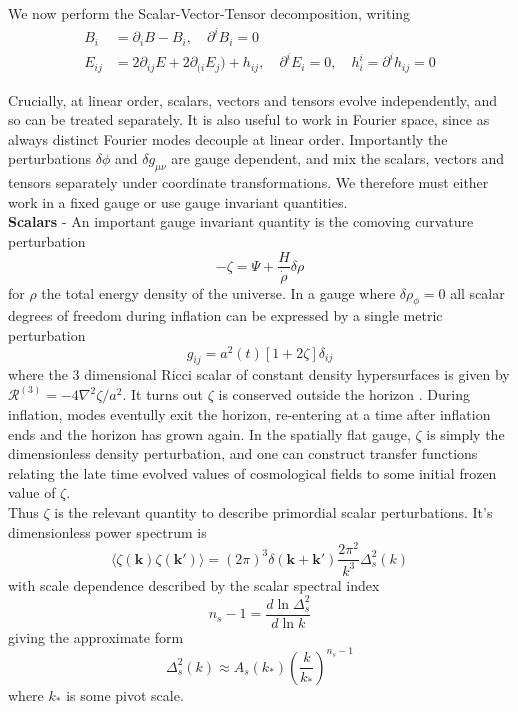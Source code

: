 \documentclass[a4paper,10pt]{article}
\renewcommand{\v}[1]{\mathbf{#1}}
\begin{document}
We now perform the Scalar-Vector-Tensor decomposition, writing
\begin{align}
B_i &= \partial_i B - B_i, \quad \partial^iB_i=0\\
E_{ij} &= 2\partial_{ij}E + 2\partial_{(i}E_{j}) + h_{ij}, \quad \partial^iE_i=0, \quad h^i_i = \partial^ih_{ij}=0
\end{align}

Crucially, at linear order, scalars, vectors and tensors evolve independently, and so can be treated separately. It is also useful to work in Fourier space, since as always distinct Fourier modes decouple at linear order. Importantly the perturbations $\delta\phi$ and $\delta g_{\mu\nu}$ are gauge dependent, and mix the scalars, vectors and tensors separately under coordinate transformations. We therefore must either work in a fixed gauge or use gauge invariant quantities.\\

\textbf{Scalars} - An important gauge invariant quantity is the comoving curvature perturbation
\begin{equation}
-\zeta = \Psi + \frac{H}{\dot\rho}\delta{\rho} 
\label{zeta}
\end{equation}
for $\rho$ the total energy density of the universe. In a gauge where $\delta{\rho}_\phi = 0$ all scalar degrees of freedom during inflation can be expressed by a single metric perturbation 
\begin{equation}
g_{ij} = a^2(t)[1+2\zeta]\delta_{ij}
\end{equation}
where the 3 dimensional Ricci scalar of constant density hypersurfaces is given by $\mathcal{R}^{(3)} = -4\nabla^2\zeta / a^2$. It turns out $\zeta$ is conserved outside the horizon \cite{baumann}. During inflation, modes eventully exit the horizon, re-entering at a time after inflation ends and the horizon has grown again. In the spatially flat gauge, $\zeta$ is simply the dimensionless density perturbation, and one can construct transfer functions relating the late time evolved values of cosmological fields to some initial frozen value of $\zeta$. \\

Thus $\zeta$ is the relevant quantity to describe primordial scalar perturbations. It's dimensionless power spectrum is
\begin{equation}
\langle \zeta(\v{k})\zeta(\v{k'}) \rangle=(2\pi)^3\delta(\v{k}+\v{k'})\frac{2\pi^2}{k^3}\Delta^2_s(k)
\end{equation}
with scale dependence described by the scalar spectral index
\begin{equation}
n_s-1 = \frac{d\ln{\Delta^2_s}}{d\ln{k}}
\end{equation}
giving the approximate form 
\begin{equation}
\Delta^2_s(k) \approx A_s(k_*)(\frac{k}{k_*})^{n_s-1} 
\end{equation}
where $k_*$ is some pivot scale. \\
\end{document}
